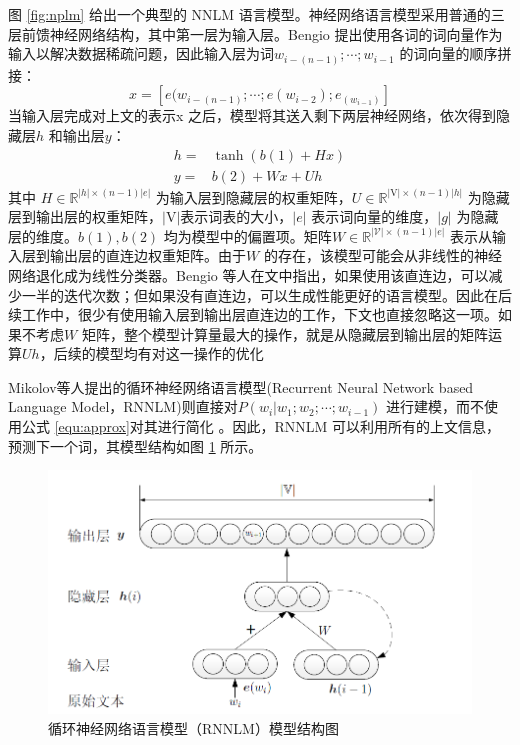 \documentclass[twoside]{buaathesis}
\begin{document}
图 \ref{fig:nplm} 给出一个典型的 NNLM 语言模型。神经网络语言模型采用普通的三层前馈神经网络结构，其中第一层为输入层。Bengio 提出使用各词的词向量作为输入以解决数据稀疏问题，因此输入层为词$w_{i-(n-1)}; \cdots;w_{i-1} $ 的词向量的顺序拼接：
\begin{equation}\label{equ:we}
  x = [e(w_{i-(n-1)}; \cdots ; e(w_{i-2}); e_{(w_{i-1})}]
\end{equation}
当输入层完成对上文的表示x 之后，模型将其送入剩下两层神经网络，依次得到隐藏层$h$ 和输出层$y$：
\begin{equation}\label{equ:all_nplm}
\begin{split}
h =& \tanh(b(1) + Hx) \\
y =& b(2) +Wx + Uh
\end{split}
\end{equation}
其中 $H \in \mathbb{R}^{|h| \times (n-1)|e|}$ 为输入层到隐藏层的权重矩阵，$U \in \mathbb{R}^{|\mathrm{V}|\times (n-1)|h|}$ 为隐藏层到输出层的权重矩阵，$ |\mathrm{V}|$表示词表的大小，$|e|$ 表示词向量的维度，$|g|$ 为隐藏层的维度。$b(1),b(2)$ 均为模型中的偏置项。矩阵$W \in \mathbb{R}^{|\mathcal{V}|\times (n-1)|e|}$ 表示从输入层到输出层的直连边权重矩阵。由于$W$ 的存在，该模型可能会从非线性的神经网络退化成为线性分类器。Bengio 等人在文中指出，如果使用该直连边，可以减少一半的迭代次数；但如果没有直连边，可以生成性能更好的语言模型。因此在后续工作中，很少有使用输入层到输出层直连边的工作，下文也直接忽略这一项。如果不考虑$W$ 矩阵，整个模型计算量最大的操作，就是从隐藏层到输出层的矩阵运算$Uh$，后续的模型均有对这一操作的优化



Mikolov等人提出的循环神经网络语言模型(Recurrent Neural Network based Language Model，RNNLM)则直接对$P(w_i | w_1;w_2;\cdots;w_{i-1}) $ 进行建模，而不使用公式 \ref{equ:approx}对其进行简化\cite{mikolov2012statistical,DBLP:conf/interspeech/MikolovKBCK10} 。因此，RNNLM 可以利用所有的上文信息，预测下一个词，其模型结构如图 \ref{fig:rnnlm} 所示。

\begin{figure}
  \centering
  \includegraphics[width=0.85\linewidth]{./figures/rnnlm.png}
  \caption{循环神经网络语言模型（RNNLM）模型结构图}\label{fig:rnnlm}
\end{figure}
\end{document}
